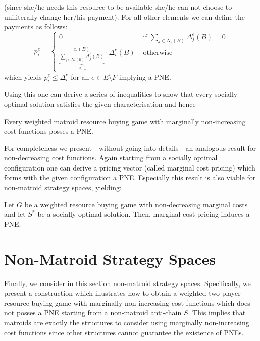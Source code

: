 \documentclass{scrartcl}
\theoremstyle{nonumberplain}
\begin{document}
(since she/he needs this resource to be available she/he can not choose to
uniliterally change her/his payment). For all other elements we can define the
payments as follows:
\begin{equation*}
  p_{i}^{e} = \begin{cases}
    0 &\text{ if } \sum_{j\in N_{e}(B)}\Delta_{j}^{e}(B) = 0\\
    \underbrace{
      \frac{c_{e}(B)}{\sum_{j\in N_{e}(B)}\Delta_{j}^{e}(B)}
    }_{\leq 1}\cdot\Delta_{i}^{e}(B) &\text{ otherwise}
  \end{cases}
\end{equation*}
which yields $p_{i}^{e}\leq \Delta_{i}^{e}$ for all $e\in E\setminus F$
implying a PNE.

Using this one can derive a series of inequalities to show that every socially
optimal solution satisfies the given characterisation and hence
\begin{theo}
  Every weighted matroid resource buying game with marginally non-increasing
  cost functions posses a PNE.
\end{theo}
For completeness we present - without going into details - an analogous result
for non-decreasing cost functions. Again starting from a socially optimal
configuration one can derive a pricing vector (called marginal cost pricing)
which forms with the given configuration a PNE. Especially this result is
also viable for non-matroid strategy spaces, yielding:
\begin{theo}
  Let $G$ be a weighted resource buying game with non-decreasing marginal costs
  and let $S^{\ast}$ be a socially optimal solution. Then, marginal cost
  pricing induces a PNE.
\end{theo}

\section{Non-Matroid Strategy Spaces}
Finally, we consider in this section non-matroid strategy spaces. Specifically,
we present a construction which illustrates how to obtain a weighted two player
resource buying game with marginally non-increasing cost functions which does
not posses a PNE starting from a non-matroid anti-chain $S$. This implies that
matroids are exactly the structures to consider using marginally non-increasing
cost functions since other structures cannot guarantee the existence of PNEs.

\todos
\end{document}
